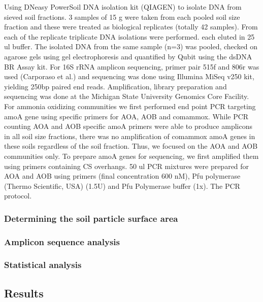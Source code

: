 \documentclass[
]{article}
\begin{document}
Using DNeasy PowerSoil DNA isolation kit (QIAGEN) to isolate DNA from
sieved soil fractions. 3 samples of 15 g were taken from each pooled
soil size fraction and these were treated as biological replicates
(totally 42 samples). From each of the replicate triplicate DNA
isolations were performed. each eluted in 25 ul buffer. The isolated DNA
from the same sample (n=3) was pooled, checked on agarose gels using gel
electrophoresis and quantified by Qubit using the dsDNA BR Assay kit.
For 16S rRNA amplicon sequencing, primer pair 515f and 806r was used
(Carporaso et al.) and sequencing was done using Illumina MiSeq v250
kit, yielding 250bp paired end reads. Amplification, library preparation
and sequencing was done at the Michigan State University Genomics Core
Facility. For ammonia oxidizing communities we first performed end point
PCR targeting amoA gene using specific primers for AOA, AOB and
comammox. While PCR counting AOA and AOB specific amoA primers were able
to produce amplicons in all soil size fractions, there was no
amplification of comammox amoA genes in these soils regardless of the
soil fraction. Thus, we focused on the AOA and AOB communities only. To
prepare amoA genes for sequencing, we first amplified them using primers
containing CS overhangs. 50 ul PCR mixtures were prepared for AOA and
AOB using primers (final concentration 600 nM), Pfu polymerase (Thermo
Scientific, USA) (1.5U) and Pfu Polymerase buffer (1x). The PCR
protocol.

\hypertarget{determining-the-soil-particle-surface-area}{%
\subsubsection{Determining the soil particle surface
area}\label{determining-the-soil-particle-surface-area}}

\hypertarget{amplicon-sequence-analysis}{%
\subsubsection{Amplicon sequence
analysis}\label{amplicon-sequence-analysis}}

\hypertarget{statistical-analysis}{%
\subsubsection{Statistical analysis}\label{statistical-analysis}}

\newpage

\hypertarget{results}{%
\subsection{Results}\label{results}}
\end{document}
